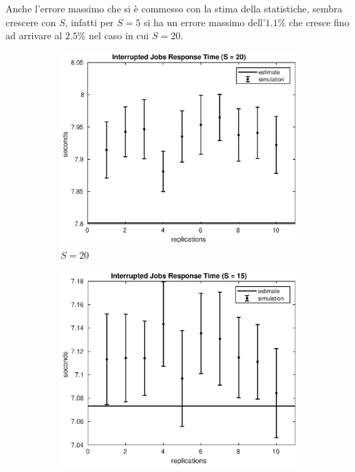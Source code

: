 Anche l'errore massimo che si è commesso con la stima della statistiche, sembra
crescere con $S$, infatti per $S=5$ si ha un errore massimo dell'$1.1\%$ che
cresce fino ad arrivare al $2.5\%$ nel caso in cui $S=20$. 
\begin{figure}[!h]
\centering
%
\begin{subfigure}[t]{0.49\textwidth}
\includegraphics[width=\textwidth]{figures/simul/20_500K_sintr}
\caption{$S = 20$}
\label{20_sintr}
\end{subfigure}
%
\begin{subfigure}[t]{0.49\textwidth}
\includegraphics[width=\textwidth]{figures/simul/15_500K_sintr}

\end{subfigure}
\end{figure}

